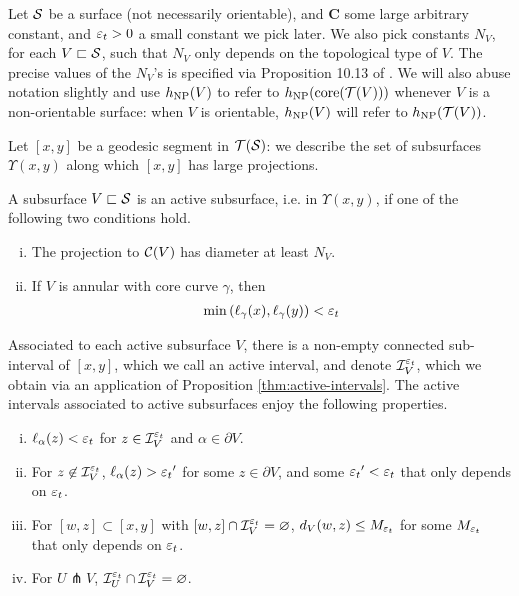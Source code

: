 Let $\mathcal{S}$ be a surface (not necessarily orientable), and $\mathbf{C}$ some large arbitrary constant, and $\varepsilon_t > 0$ a small constant we pick later.
We also pick constants $N_V$, for each $V \sqsubset \mathcal{S}$, such that $N_V$ only depends on the topological type of $V$.
The precise values of the $N_V$'s is specified via Proposition 10.13 of \cite{dowdall2023lattice}.
We will also abuse notation slightly and use $h_{\mathrm{NP}}(V)$ to refer to $h_{\mathrm{NP}}(\mathrm{core}(\mathcal{T}(V)))$ whenever $V$ is a non-orientable surface: when $V$ is orientable, $h_{\mathrm{NP}}(V)$ will refer to $h_{\mathrm{NP}}(\mathcal{T}(V))$.

Let $[x,y]$ be a geodesic segment in $\mathcal{T}(\mathcal{S})$: we describe the set of subsurfaces $\Upsilon(x, y)$ along which $[x, y]$ has large projections.

\begin{definition}
  A subsurface $V \sqsubset \mathcal{S}$ is an active subsurface, i.e. in $\Upsilon(x,y)$, if one of the following two conditions hold.
  \begin{enumerate}[(i)]
  \item The projection to $\mathcal{C}(V)$ has diameter at least $N_V$.
  \item If $V$ is annular with core curve $\gamma$, then
    \begin{align*}
      \min\left( \ell_\gamma(x), \ell_{\gamma}(y) \right) < \varepsilon_t
    \end{align*}
  \end{enumerate}
\end{definition}

Associated to each active subsurface $V$, there is a non-empty connected sub-interval of $[x,y]$, which we call an active interval, and denote $\mathcal{I}_V^{\varepsilon_t}$, which we obtain via an application of Proposition \ref{thm:active-intervals}.
The active intervals associated to active subsurfaces enjoy the following properties.
\begin{enumerate}[(i)]
\item $\ell_\alpha(z) < \varepsilon_t$ for $z \in \mathcal{I}_V^{\varepsilon_t}$ and $\alpha \in \partial V$.
\item For $z \not \in \mathcal{I}_V^{\varepsilon_t}$, $\ell_{\alpha}(z) > {\varepsilon_t}^{\prime}$ for some $z \in \partial V$, and some ${\varepsilon_t}^{\prime} < {\varepsilon_t}$ that only depends on ${\varepsilon_t}$.
\item For $[w,z] \subset [x,y]$ with $[w,z] \cap \mathcal{I}_V^{\varepsilon_t} = \varnothing$, $d_V(w,z) \leq M_{\varepsilon_t}$ for some $M_{\varepsilon_t}$ that only depends on ${\varepsilon_t}$.
\item For $U \pitchfork V$, $\mathcal{I}_U^{\varepsilon_t} \cap \mathcal{I}_V^{\varepsilon_t} = \varnothing$.
\end{enumerate}

